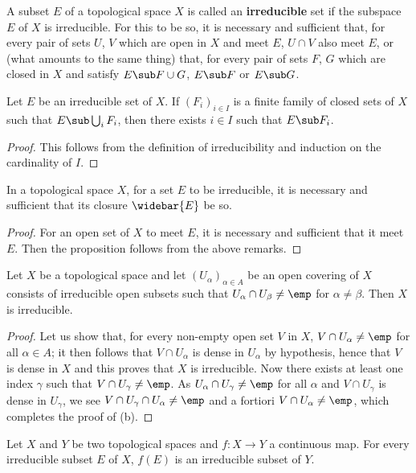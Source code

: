 A subset $E$ of a topological space $X$ is called an \textbf{irreducible} set if the subspace $E$ of $X$ is irreducible. For this to be so, it is necessary and sufficient that, for every pair of sets $U$, $V$ which are open in $X$ and meet $E$, $U\cap V$ also meet $E$, or (what amounts to the same thing) that, for every pair of sets $F$, $G$ which are closed in $X$ and satisfy $E\sub F\cup G$, $E\sub F$ or $E\sub G$. 
\begin{proposition}\label{topo space irreducible contained in finite union}
Let $E$ be an irreducible set of $X$. If $(F_i)_{i\in I}$ is a finite family of closed sets of $X$ such that $E\sub\bigcup_iF_i$, then there exists $i\in I$ such that $E\sub F_i$.
\end{proposition}
\begin{proof}
This follows from the definition of irreducibility and induction on the cardinality of $I$.
\end{proof}
\begin{proposition}\label{topological subspace irreducible iff closure}
In a topological space $X$, for a set $E$ to be irreducible, it is necessary and sufficient that its closure $\widebar{E}$ be so.
\end{proposition}
\begin{proof}
For an open set of $X$ to meet $E$, it is necessary and sufficient that it meet $E$. Then the proposition follows from the above remarks.
\end{proof}
\begin{proposition}\label{topo space open cover of irreducible is irreducible if}
Let $X$ be a topological space and let $(U_\alpha)_{\alpha\in A}$ be an open covering of $X$ consists of irreducible open subsets such that $U_\alpha\cap U_\beta\neq\emp$ for $\alpha\neq\beta$. Then $X$ is irreducible.
\end{proposition}
\begin{proof}
Let us show that, for every non-empty open set $V$ in $X$, $V\cap U_\alpha\neq\emp$ for all $\alpha\in A$; it then follows that $V\cap U_\alpha$ is dense in $U_\alpha$ by hypothesis, hence that $V$ is dense in $X$ and this proves that $X$ is irreducible. Now there exists at least one index $\gamma$ such that $V\cap U_\gamma\neq\emp$. As $U_\alpha\cap U_\gamma\neq\emp$ for all $\alpha$ and $V\cap U_\gamma$ is dense in $U_\gamma$, we see $V\cap U_\gamma\cap U_\alpha\neq\emp$ and a fortiori $V\cap U_\alpha\neq\emp$, which completes the proof of (b).
\end{proof}
\begin{proposition}\label{topo space irreducible under continuous map}
Let $X$ and $Y$ be two topological spaces and $f:X\to Y$ a continuous map. For every irreducible subset $E$ of $X$, $f(E)$ is an irreducible subset of $Y$.
\end{proposition}
